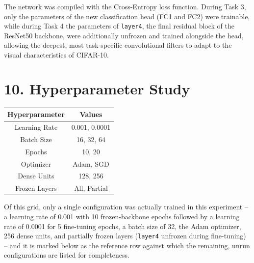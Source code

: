 \documentclass[11pt,a4paper]{article}
\begin{document}
\vspace{0.15cm}

The network was compiled with the Cross-Entropy loss function. During Task 3, only the parameters of the new classification head (FC1 and FC2) were trainable, while during Task 4 the parameters of \texttt{layer4}, the final residual block of the ResNet50 backbone, were additionally unfrozen and trained alongside the head, allowing the deepest, most task-specific convolutional filters to adapt to the visual characteristics of CIFAR-10.

\section*{10. Hyperparameter Study}

\begin{center}
\begin{tabular}{|c|c|}
\hline
\textbf{Hyperparameter} & \textbf{Values}\\
\hline
Learning Rate & 0.001, 0.0001\\
\hline
Batch Size & 16, 32, 64\\
\hline
Epochs & 10, 20\\
\hline
Optimizer & Adam, SGD\\
\hline
Dense Units & 128, 256\\
\hline
Frozen Layers & All, Partial\\
\hline
\end{tabular}
\end{center}

\vspace{0.15cm}

Of this grid, only a single configuration was actually trained in this experiment -- a learning rate of 0.001 with 10 frozen-backbone epochs followed by a learning rate of 0.0001 for 5 fine-tuning epochs, a batch size of 32, the Adam optimizer, 256 dense units, and partially frozen layers (\texttt{layer4} unfrozen during fine-tuning) -- and it is marked below as the reference row against which the remaining, unrun configurations are listed for completeness.
\end{document}
